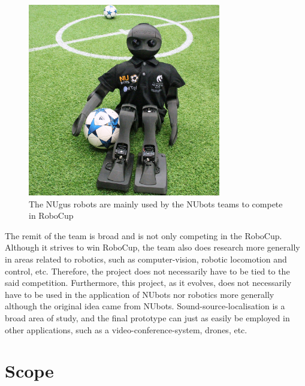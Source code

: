 \documentclass[notitlepage]{report}
\begin{document}
\begin{figure}[H]
\includegraphics[width=0.75\textwidth]{./NUbot-sitting-down.jpg}
\centering
\caption{The NUgus robots are mainly used by the NUbots teams to compete in RoboCup}
\label{fig:nuguses}
\centering
\end{figure}

The remit of the team is broad and is not only competing in the RoboCup. Although it strives to win RoboCup, the team also does research more generally in areas related to robotics, such as computer-vision, robotic locomotion and control, etc. Therefore, the project does not necessarily have to be tied to the said competition. Furthermore, this project, as it evolves, does not necessarily have to be used in the application of NUbots nor robotics more generally although the original idea came from NUbots. Sound-source-localisation is a broad area of study, and the final prototype can just as easily be employed in other applications, such as a video-conference-system, drones, etc.

\section{Scope}
\end{document}
